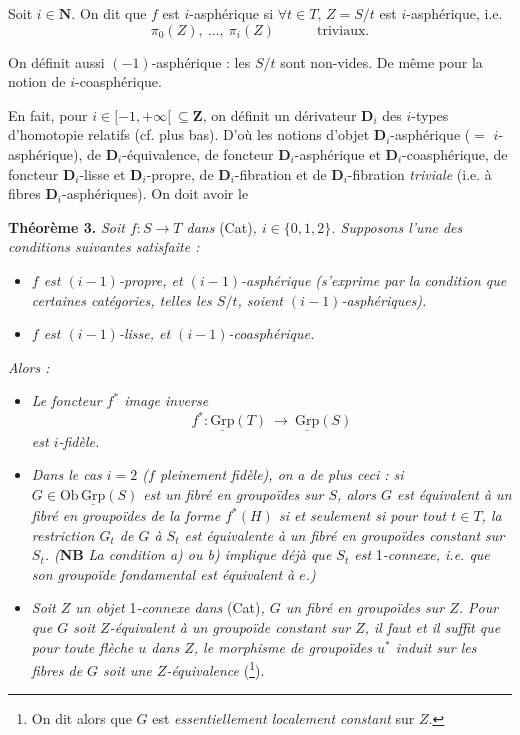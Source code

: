 \documentclass[11pt]{article}
\newcommand{\printedpage}[1]{\marginpar{\footnotesize p.~#1}}
\newcommand{\msp}[1]{\marginpar{\footnotesize [#1]}}
\newcommand{\uGrp}{\underline{\mathrm{Grp}}}
\newcommand{\fl}{\longrightarrow}
\begin{document}
\msp{page 8}
Soit $i \in \mathbf{N}$. On dit que $f$ est $i$-asphérique si $\forall t \in T$, $Z = S/t$ est $i$-asphérique, i.e.
\[
\pi_0(Z),\ \dots,\ \pi_i(Z) \qquad\quad \text{triviaux.}
\tag*{$(*)$}
\]

On définit aussi $(-1)$-asphérique : les $S/t$ sont non-vides. De même pour la notion de $i$-coasphérique.

En fait, pour $i \in [-1,+\infty[ \ \subseteq \mathbf{Z}$, on définit un dérivateur $\mathbf{D}_i$ des $i$-types d'homotopie relatifs (cf. plus bas). D'où les notions d'objet $\mathbf{D}_i$-asphérique ($=$ $i$-asphérique), de $\mathbf{D}_i$-équivalence, de foncteur $\mathbf{D}_i$-asphérique et $\mathbf{D}_i$-coasphérique, de foncteur $\mathbf{D}_i$-lisse et $\mathbf{D}_i$-propre, de $\mathbf{D}_i$-fibration et de $\mathbf{D}_i$-fibration \textit{triviale} (i.e. à fibres $\mathbf{D}_i$-asphériques). On doit avoir le

\textbf{Théorème 3.} \textit{Soit $f : S \fl T$ dans} (Cat)\textit{, $i \in \{0,1,2\}$. Supposons l'une des conditions suivantes satisfaite :}

\begin{itemize}[leftmargin=3em]
\item[\textit{a)}] \textit{$f$ est $(i-1)$-propre, et $(i-1)$-asphérique (s'exprime par la condition que certaines catégories, telles les $S/t$, soient $(i-1)$-asphériques).}
\item[\textit{b)}] \textit{$f$ est $(i-1)$-lisse, et $(i-1)$-coasphérique.}
\end{itemize}

\textit{Alors :}

\begin{itemize}[leftmargin=3em]
\item[\textit{1\textsuperscript{o})}] \textit{Le foncteur $f^*$ image inverse}
\[
f^* : \uGrp(T) \ \fl\ \uGrp(S)
\]
\textit{est $i$-fidèle.}
\item[\textit{2\textsuperscript{o})}] \textit{Dans le cas $i = 2$ ($f$ pleinement fidèle), on}
\printedpage{8}
\msp{page 9}
\textit{a de plus ceci : si $G \in \mathrm{Ob}\,\uGrp(S)$ est un fibré en groupoïdes sur $S$, alors $G$ est équivalent à un fibré en groupoïdes de la forme $f^*(H)$ si et seulement si pour tout $t \in T$, la restriction $G_t$ de $G$ à $S_t$ est équivalente à un fibré en groupoïdes constant sur $S_t$. (}\textbf{NB} \textit{La condition a) ou b) implique déjà que $S_t$ est} 1\textit{-connexe, i.e. que son groupoïde fondamental est équivalent à $e$.)}
\item[\textit{3\textsuperscript{o})}] \textit{Soit $Z$ un objet} 1\textit{-connexe dans} (Cat)\textit{, $G$ un fibré en groupoïdes sur $Z$. Pour que $G$ soit $Z$-équivalent à un groupoïde constant sur $Z$, il faut et il suffit que pour toute flèche $u$ dans $Z$, le morphisme de groupoïdes $u^*$ induit sur les fibres de $G$ soit une $Z$-équivalence} (\footnote[3]{On dit alors que $G$ est \textit{essentiellement localement constant} sur $Z$.}).
\end{itemize}
\end{document}

